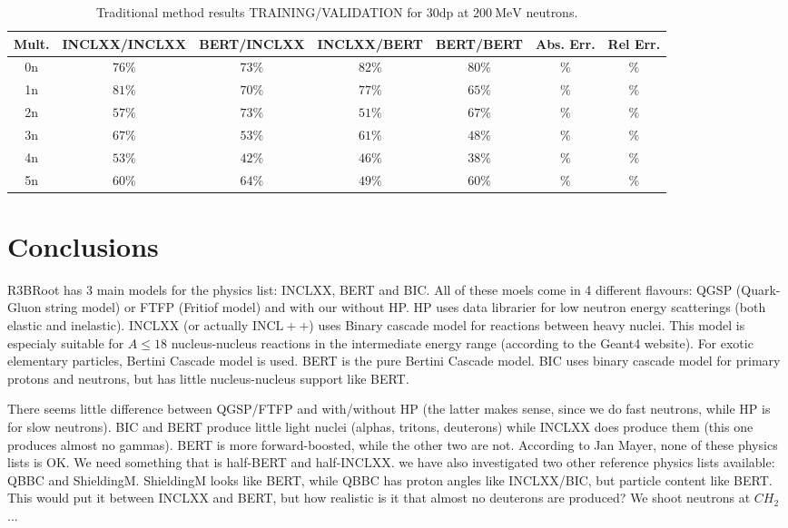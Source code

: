 \documentclass[10pt,a4paper]{report}
\newcommand{\MeV}[0]{\ \textrm{MeV}}
\begin{document}
\begin{table}[htbp] 
\centering
\caption{Traditional method results TRAINING/VALIDATION for \textrm{30dp} at ${200 \MeV}$ neutrons.}
\label{tab:30dp200}
\begin{tabular}{| c | c c c c | c c |} 
\hline
Mult. & INCLXX/INCLXX & BERT/INCLXX & INCLXX/BERT & BERT/BERT & Abs. Err. & Rel Err.   \\
\hline
0n    & ${76 \%}$     & ${73 \%}$   & ${82 \%}$   & ${80 \%}$ & ${ \%}$  & ${ \%}$ \\
1n    & ${81 \%}$     & ${70 \%}$   & ${77 \%}$   & ${65 \%}$ & ${ \%}$  & ${ \%}$ \\
2n    & ${57 \%}$     & ${73 \%}$   & ${51 \%}$   & ${67 \%}$ & ${ \%}$  & ${ \%}$ \\
3n    & ${67 \%}$     & ${53 \%}$   & ${61 \%}$   & ${48 \%}$ & ${ \%}$  & ${ \%}$ \\
4n    & ${53 \%}$     & ${42 \%}$   & ${46 \%}$   & ${38 \%}$ & ${ \%}$  & ${ \%}$ \\
5n    & ${60 \%}$     & ${64 \%}$   & ${49 \%}$   & ${60 \%}$ & ${ \%}$  & ${ \%}$  \\
\hline
\end{tabular}
\end{table}





\FloatBarrier
\section{Conclusions}
\label{sec:conc}

\par
R3BRoot has 3 main models for the physics list: INCLXX, BERT and BIC. All of these moels come in 4 different flavours: QGSP (Quark-Gluon string model) or FTFP (Fritiof model) and with our without HP. HP uses data librarier for low neutron energy scatterings (both elastic and inelastic). INCLXX (or actually ${\textrm{INCL}++}$) uses Binary cascade model for reactions between heavy nuclei. This model is especialy suitable for ${A \leq 18}$ nucleus-nucleus reactions in the intermediate energy range (according to the Geant4 website). For exotic elementary particles, Bertini Cascade model is used. BERT is the pure Bertini Cascade model. BIC uses binary cascade model for primary protons and neutrons, but has little nucleus-nucleus support like BERT.

\par
There seems little difference between QGSP/FTFP and with/without HP (the latter makes sense, since we do fast neutrons, while HP is for slow neutrons). BIC and BERT produce little light nuclei (alphas, tritons, deuterons) while INCLXX does produce them (this one produces almost no gammas). BERT is more forward-boosted, while the other two are not. According to Jan Mayer, none of these physics lists is OK. We need something that is half-BERT and half-INCLXX. we have also investigated two other reference physics lists available: QBBC and ShieldingM. ShieldingM looks like BERT, while QBBC has proton angles like INCLXX/BIC, but particle content like BERT. This would put it between INCLXX and BERT, but how realistic is it that almost no deuterons are produced? We shoot neutrons at ${CH_2}$...
\end{document}
